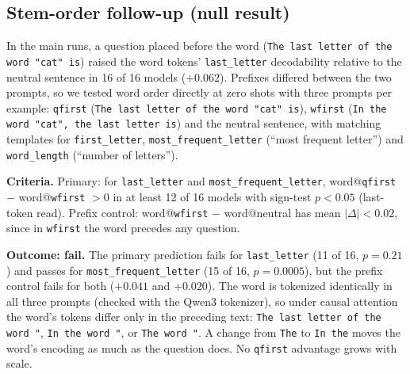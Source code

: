 \subsection{Stem-order follow-up (null result)}
\label{app:prereg_f3}
In the main runs, a question placed before the word (\texttt{The last letter of the word "cat" is})
raised the word tokens' \texttt{last\_letter} decodability relative to the neutral sentence in 16 of
16 models ($+0.062$). Prefixes differed between the two prompts, so we tested word order directly at
zero shots with three prompts per example:
\texttt{qfirst} (\texttt{The last letter of the word "cat" is}), \texttt{wfirst}
(\texttt{In the word "cat", the last letter is}) and the neutral sentence, with matching templates
for \texttt{first\_letter}, \texttt{most\_frequent\_letter} (``most frequent letter'') and
\texttt{word\_length} (``number of letters'').

\textbf{Criteria.} Primary: for \texttt{last\_letter} and \texttt{most\_frequent\_letter},
word@\texttt{qfirst} $-$ word@\texttt{wfirst} $> 0$ in at least 12 of 16 models with sign-test
$p < 0.05$ (last-token read). Prefix control: word@\texttt{wfirst} $-$ word@neutral has mean
$|\Delta| < 0.02$, since in \texttt{wfirst} the word precedes any question.

\textbf{Outcome: fail.} The primary prediction fails for \texttt{last\_letter} (11 of 16, $p = 0.21$)
and passes for \texttt{most\_frequent\_letter} (15 of 16, $p = 0.0005$), but the prefix control fails
for both ($+0.041$ and $+0.020$). The word is tokenized identically in all three prompts (checked with
the Qwen3 tokenizer), so under causal attention the word's tokens differ only in the preceding text:
\texttt{The last letter of the word "}, \texttt{In the word "}, or \texttt{The word "}. A change from
\texttt{The} to \texttt{In the} moves the word's encoding as much as the question does. No
\texttt{qfirst} advantage grows with scale.

\begin{table}[h]
  \centering\footnotesize
  \setlength{\tabcolsep}{5pt}
  
  \caption{Stem-order follow-up, zero shots, 16 models, held-out layer selection. Columns give
    the mean difference, models with a positive difference, a two-sided exact sign test, the prefix
    control (\texttt{wfirst} $-$ neutral), and the correlation of the difference with scale.}
  \label{tab:f3}
\end{table}

